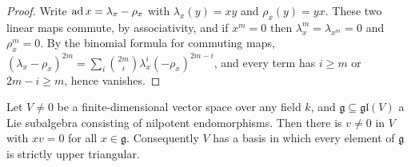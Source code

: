 \begin{proof}
Write $\operatorname{ad} x = \lambda_x - \rho_x$ with $\lambda_x(y) = xy$ and $\rho_x(y) = yx$. These two linear maps commute, by associativity, and if $x^m = 0$ then
$\lambda_x^m = \lambda_{x^m} = 0$ and $\rho_x^m = 0$. By the binomial formula for commuting maps, $(\lambda_x - \rho_x)^{2m} = \sum_i\binom{2m}{i}\lambda_x^i(-\rho_x)^{2m - i}$,
and every term has $i \geq m$ or $2m - i \geq m$, hence vanishes.
\end{proof}

\begin{theorem}\label{representation-theory:theorem-engel-linear}
Let $V \neq 0$ be a finite-dimensional vector space over any field $k$, and $\mathfrak{g} \subseteq \mathfrak{gl}(V)$ a Lie subalgebra consisting of nilpotent
endomorphisms. Then there is $v \neq 0$ in $V$ with $xv = 0$ for all $x \in \mathfrak{g}$. Consequently $V$ has a basis in which every element of $\mathfrak{g}$ is
strictly upper triangular.
\end{theorem}

